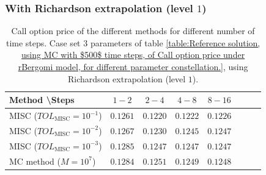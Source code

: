 \FloatBarrier
\subsubsection*{With Richardson extrapolation (level $1$)}
\FloatBarrier
\begin{table}[h!]
	\centering
	\begin{tabular}{l*{6}{c}r}
		Method \textbackslash  Steps    &$1-2$         & $2-4$ & $4-8$ & $8-16$\\
		\hline
		MISC ($TOL_{\text{MISC}}=10^{-1}$)   &$ 0.1261$ & $0.1220$  &$0.1222$ & $0.1226$\\
		MISC ($TOL_{\text{MISC}}=10^{-2}$)   &$ 0.1267$ & $0.1230$ & $0.1245$ & $0.1247$  \\	
		MISC ($TOL_{\text{MISC}}=10^{-3}$)   &$0.1285$ & $0.1247$ & $0.1247$ &  $0.1247$ \\
	
		\hline
		MC method ($M=10^{7}$)   & $     0.1284$  & $ 
		0.1251$  & $0.1249$ & $  0.1248$ \\		
		\hline
	\end{tabular}
	\caption{Call option price of the different methods for different number of time steps. Case set $3$ parameters of table \ref{table:Reference solution, using MC with $500$ time steps, of Call option price under rBergomi model, for different parameter constellation.}, using Richardson extrapolation (level $1$).}
	\label{table:  Call option price of the different methods for different number of time steps. Case set $5$ parameter, using Richardson extrapolation (level $3$)}
\end{table}
\FloatBarrier


